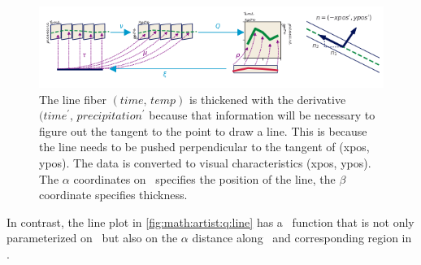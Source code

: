 \documentclass[../main.tex]{subfiles}
\begin{document}
\begin{figure}[H]
    \includegraphics[width=\textwidth]{figures/math/line.png}
    \caption{The line fiber $(time,\, temp)$ is thickened with the derivative $(time^{\prime},\, precipitation^{\prime}$ because that information will be necessary to figure out the tangent to the point to draw a line. This is because the line needs to be pushed perpendicular to the tangent of (xpos, ypos). The data is converted to visual characteristics (xpos, ypos). The $\alpha$ coordinates on \gbase\ specifies the position of the line, the $\beta$ coordinate specifies thickness.}
    \label{fig:math:artist:q:line}
\end{figure}
In contrast, the line plot in \autoref{fig:math:artist:q:line} has a \vindex\ function that is not only parameterized on \dbasepoint\ but also on the $\alpha$ distance along \dbasepoint\ and corresponding region in \gbase. 
\end{document}
